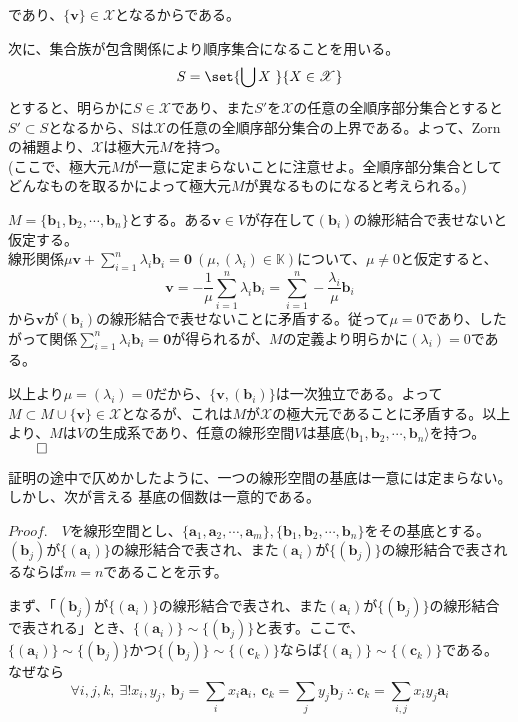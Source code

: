 \documentclass[dvipdfmx]{jsarticle}
\begin{document}
であり、$\{\bm{v}\}\in\mathscr{X}$となるからである。\par
次に、集合族が包含関係により順序集合になることを用いる。
\[S=\set{\bigcup X~}{X\in\mathscr{X}}\]
とすると、明らかに$S\in\mathscr{X}$であり、また$S'$を$\mathscr{X}$の任意の全順序部分集合とすると$S' \subset S$となるから、Sは$\mathscr{X}$の任意の全順序部分集合の上界である。よって、Zornの補題より、$\mathscr{X}$は極大元$M$を持つ。\\
(ここで、極大元$M$が一意に定まらないことに注意せよ。全順序部分集合としてどんなものを取るかによって極大元$M$が異なるものになると考えられる。)\par
$M=\{\bm{b}_1,\bm{b}_2,\cdots,\bm{b}_n\}$とする。ある$\bm{v} \in V$が存在して$(\bm{b}_i)$の線形結合で表せないと仮定する。\\
線形関係$\mu\bm{v}+\displaystyle\sum_{i=1}^n\lambda_i\bm{b}_i=\bm{0}~(\mu,(\lambda_i)\in\mathbb{K})$について、$\mu\neq0$と仮定すると、
\[\bm{v}=-\frac{1}{\mu}\sum_{i=1}^n\lambda_i\bm{b}_i=\sum_{i=1}^n-\frac{\lambda_i}{\mu}\bm{b}_i\]
から$\bm{v}$が$(\bm{b}_i)$の線形結合で表せないことに矛盾する。従って$\mu=0$であり、したがって関係$\displaystyle\sum_{i=1}^n\lambda_i\bm{b}_i=\bm{0}$が得られるが、$M$の定義より明らかに$(\lambda_i)=0$である。\par
以上より$\mu=(\lambda_i)=0$だから、$\{\bm{v},(\bm{b}_i)\}$は一次独立である。よって$M \subset M \cup \{\bm{v}\} \in \mathscr{X}$となるが、これは$M$が$\mathscr{X}$の極大元であることに矛盾する。以上より、$M$は$V$の生成系であり、任意の線形空間$V$は基底$\langle\bm{b}_1,\bm{b}_2,\cdots,\bm{b}_n\rangle$を持つ。$\qed$\\\par
証明の途中で仄めかしたように、一つの線形空間の基底は一意には定まらない。しかし、次が言える\newpage
{}基底の個数は一意的である。\\\par
$Proof.$　$V$を線形空間とし、$\{\bm{a}_1,\bm{a}_2,\cdots,\bm{a}_m\},\{\bm{b}_1,\bm{b}_2,\cdots,\bm{b}_n\}$をその基底とする。$(\bm{b}_j)$が$\{(\bm{a}_i)\}$の線形結合で表され、また$(\bm{a}_i)$が$\{(\bm{b}_j)\}$の線形結合で表されるならば$m=n$であることを示す。\par
まず、「$(\bm{b}_j)$が$\{(\bm{a}_i)\}$の線形結合で表され、また$(\bm{a}_i)$が$\{(\bm{b}_j)\}$の線形結合で表される」とき、$\{(\bm{a}_i)\}\sim\{(\bm{b}_j)\}$と表す。ここで、$\{(\bm{a}_i)\}\sim\{(\bm{b}_j)\}かつ\{(\bm{b}_j)\}\sim\{(\bm{c}_k)\}$ならば$\{(\bm{a}_i)\}\sim\{(\bm{c}_k)\}$である。なぜなら
\[\forall i,j,k,~\exists! x_i,y_j,~\bm{b}_j=\sum_i x_i\bm{a}_i,~\bm{c}_k=\sum_j y_j\bm{b}_j~\therefore~\bm{c}_k=\sum_{i,j} x_iy_j\bm{a}_i\]
\end{document}
